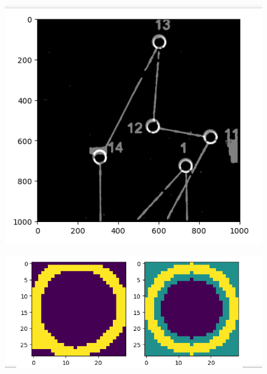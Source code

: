 \documentclass[a4paper,12pt]{extarticle}
\begin{document}
\begin{figure}[H]
    \centering
    \includegraphics[width=\linewidth]{circle_detection.png}
    \label{fig:circledetection}
\end{figure}
\begin{figure}[H]
    \centering
    \includegraphics[width=\linewidth]{circle_kernel.png}
    \label{fig:circlekernel}
\end{figure}
\end{document}
